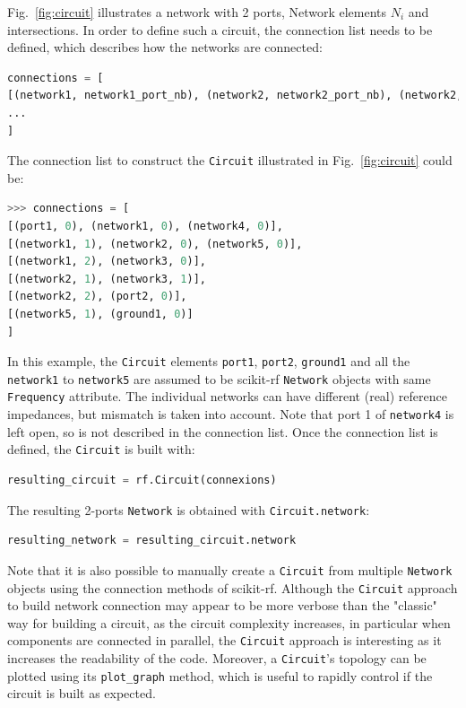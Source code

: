 \documentclass[journal, onecolumn]{IEEEtran}
\begin{document}
Fig.~\ref{fig:circuit} illustrates a network with 2 ports, Network elements $N_i$ and intersections. In order to define such a circuit, the connection list needs to be defined, which describes how the networks are connected:

\begin{lstlisting}[language=Python]
connections = [
[(network1, network1_port_nb), (network2, network2_port_nb), (network2, network2_port_nb), ...], 
...
]
\end{lstlisting}

The connection list to construct the \texttt{Circuit} illustrated in Fig.~\ref{fig:circuit} could be:

\begin{lstlisting}[language=Python]
>>> connections = [
[(port1, 0), (network1, 0), (network4, 0)],
[(network1, 1), (network2, 0), (network5, 0)],
[(network1, 2), (network3, 0)],
[(network2, 1), (network3, 1)],
[(network2, 2), (port2, 0)],
[(network5, 1), (ground1, 0)]
]
\end{lstlisting}

In this example, the \texttt{Circuit} elements \texttt{port1}, \texttt{port2}, \texttt{ground1} and all the \texttt{network1} to \texttt{network5} are assumed to be scikit-rf \texttt{Network} objects with same \texttt{Frequency} attribute. The individual networks can have different (real) reference impedances, but mismatch is taken into account. Note that port 1 of \texttt{network4} is left open, so is not described in the connection list. Once the connection list is defined, the \texttt{Circuit} is built with:

\begin{lstlisting}[language=Python]
resulting_circuit = rf.Circuit(connexions)
\end{lstlisting}

The resulting 2-ports \texttt{Network} is obtained with \texttt{Circuit.network}:
\begin{lstlisting}[language=Python]
resulting_network = resulting_circuit.network
\end{lstlisting}

Note that it is also possible to manually create a \texttt{Circuit} from multiple \texttt{Network} objects using the connection methods of scikit-rf. Although the \texttt{Circuit} approach to build network connection may appear to be more verbose than the "classic" way for building a circuit, as the circuit complexity increases, in particular when components are connected in parallel, the \texttt{Circuit} approach is interesting as it increases the readability of the code. Moreover, a \texttt{Circuit}'s topology can be plotted using its \texttt{plot\_graph} method, which is useful to rapidly control if the circuit is built as expected.
\end{document}
